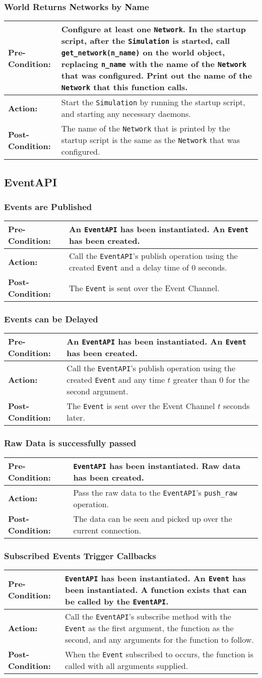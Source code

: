 \documentclass[titlepage]{article}
\newcommand{\testcase}[3]{
    \begin{center}
    \begin{tabular}{| l | p{0.7\textwidth}|}
        \hline
        \rowcolor[gray]{0.8}\textbf{Pre-Condition:} & #1 \\ \hline
        \textbf{Action:} & #2 \\ \hline
        \rowcolor[gray]{0.8}\textbf{Post-Condition:} & #3 \\ \hline
    \end{tabular}
    \end{center}
}
\begin{document}
\subsubsection{World Returns Networks by Name}
\testcase{Configure at least one \texttt{Network}.  In the startup script, after the \texttt{Simulation} is started, call \texttt{get\_network(n\_name)} on the world object, replacing \texttt{n\_name} with the name of the \texttt{Network} that was configured.  Print out the name of the \texttt{Network} that this function calls.}{Start the \texttt{Simulation} by running the startup script, and starting any necessary daemons.}{The name of the \texttt{Network} that is printed by the startup script is the same as the \texttt{Network} that was configured.}

\subsection{EventAPI}
\subsubsection{Events are Published}
\testcase{An \texttt{EventAPI} has been instantiated. An \texttt{Event} has been created.}{Call the \texttt{EventAPI}'s publish operation using the created \texttt{Event} and a delay time of 0 seconds.}{The \texttt{Event} is sent over the Event Channel.}

\subsubsection{Events can be Delayed}
\testcase{An \texttt{EventAPI} has been instantiated. An \texttt{Event} has been created.}{Call the \texttt{EventAPI}'s publish operation using the created \texttt{Event} and any time $t$ greater than 0 for the second argument.}{The \texttt{Event} is sent over the Event Channel $t$ seconds later.}

\subsubsection{Raw Data is successfully passed}
\testcase{\texttt{EventAPI} has been instantiated. Raw data has been created.}{Pass the raw data to the \texttt{EventAPI}'s \texttt{push\_raw} operation.}{The data can be seen and picked up over the current connection.}

\subsubsection{Subscribed Events Trigger Callbacks}
\testcase{\texttt{EventAPI} has been instantiated.  An \texttt{Event} has been instantiated. A function exists that can be called by the \texttt{EventAPI}.}{Call the \texttt{EventAPI}'s subscribe method with the \texttt{Event} as the first argument, the function as the second, and any arguments for the function to follow.}{When the \texttt{Event} subscribed to occurs, the function is called with all arguments supplied. }
\end{document}
